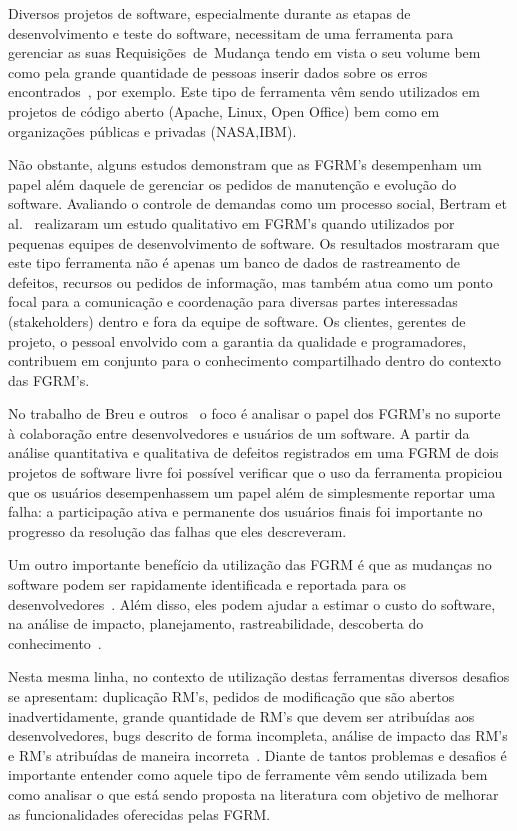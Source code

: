 Diversos projetos de software, especialmente durante as etapas de
desenvolvimento e teste do software, necessitam de uma ferramenta para gerenciar
as suas Requisições~de~Mudança tendo em vista o seu volume bem como pela grande
quantidade de pessoas inserir dados sobre os erros encontrados~\cite{1407819},
por exemplo. Este tipo de ferramenta vêm sendo utilizados em projetos de código
aberto (Apache, Linux, Open Office) bem como em organizações públicas e privadas
(NASA,IBM).

Não obstante, alguns estudos demonstram que as FGRM's desempenham um papel além
daquele de gerenciar os pedidos de manutenção e evolução do software. Avaliando
o controle de demandas como um processo social, Bertram et
al.~\cite{Bertram:2010:CCB:1718918.1718972} realizaram um estudo qualitativo em
FGRM's quando utilizados por pequenas equipes de desenvolvimento de software. Os
resultados mostraram que este tipo ferramenta não é apenas um banco de dados de
rastreamento de defeitos, recursos ou pedidos de informação, mas também atua
como um ponto focal para a comunicação e coordenação para diversas partes
interessadas (stakeholders) dentro e fora da equipe de software. Os clientes,
gerentes de projeto, o pessoal envolvido com a garantia da qualidade e
programadores, contribuem em conjunto para o conhecimento compartilhado dentro
do contexto das FGRM's.

No trabalho de Breu e outros~\cite{Breu:2010:INB:1718918.1718973} o foco é
analisar o papel dos FGRM's no suporte à colaboração entre desenvolvedores e
usuários de um software. A partir da análise quantitativa e qualitativa de
defeitos registrados em uma FGRM de dois projetos de software livre foi possível
verificar que o uso da ferramenta propiciou que os usuários desempenhassem um
papel além de simplesmente reportar uma falha: a participação ativa e permanente
dos usuários finais foi importante no progresso da resolução das falhas que eles
descreveram.

Um outro importante benefício da utilização das FGRM é que as mudanças no
software podem ser rapidamente identificada e reportada para os
desenvolvedores~\cite{anvik2005coping}. Além disso, eles podem ajudar a estimar
o custo do software, na análise de impacto, planejamento, rastreabilidade,
descoberta do conhecimento~\cite{cavalcanti2013bug}.

Nesta mesma linha, no contexto de utilização destas ferramentas diversos
desafios se apresentam: duplicação RM's, pedidos de modificação que são abertos
	inadvertidamente, grande quantidade de RM's que devem ser atribuídas aos
desenvolvedores, bugs descrito de forma incompleta, análise de impacto das RM's
e RM's atribuídas de maneira incorreta~\cite{cavalcanti2014challenges}.  Diante
de tantos problemas e desafios é importante entender como aquele tipo de
ferramente vêm sendo utilizada bem como analisar o que está sendo proposta na
literatura com objetivo de melhorar as funcionalidades oferecidas pelas FGRM\@.

